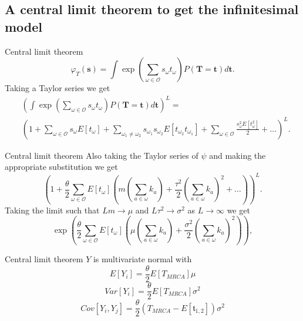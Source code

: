 \documentclass{beamer}
\begin{document}
\subsection{A central limit theorem to get the infinitesimal model}

\begin{frame}{Central limit theorem}
  \begin{equation*}
    \varphi_T(\mathbf{s}) = \int \exp \left( \sum_{\omega \in \mathcal{O}} s_{\omega}t_{\omega} \right)
    P(\mathbf{T}=\mathbf{t})d\mathbf{t}. \nonumber
  \end{equation*}
  Taking a Taylor series we get
  \scriptsize
  \begin{align}
    \label{eq:mgf_L}
    &\left(\int \exp \left( \sum_{\omega \in \mathcal{O}} s_{\omega}t_{\omega}
      \right)P(\mathbf{T}=\mathbf{t})d\mathbf{t}\right)^L = \nonumber \\  &\left(1 + \sum_{\omega \in \mathcal{O}}
      s_{\omega}E[t_{\omega}] + \sum_{\omega_1 \neq \omega_2}
      s_{\omega_1}s_{\omega_2}E[t_{\omega_2}t_{\omega_1}] + \sum_{\omega \in
        \mathcal{O}} \frac{s_{\omega}^2E[t_{\omega}^2]}{2} + \ldots\right)^L. \nonumber
  \end{align}
  \normalsize
\end{frame}

\begin{frame}{Central limit theorem}
  Also taking the Taylor series of $\psi$ and making the appropriate substitution we get
  \begin{equation*}
    \left( 1 + \frac{\theta}{2} \sum_{\omega \in \mathcal{O}} E[t_{\omega}]\left( m \left(
          \sum_{a \in \omega} k_a\right) + \frac{\tau^2}{2}\left( \sum_{a \in \omega}
          k_a\right)^2 + \ldots\right)\right)^L.
  \end{equation*}
  Taking the limit such that $Lm \to \mu$ and $L\tau^2\to \sigma^2$ as $L
  \to \infty$ we get
  \begin{equation*}
    \exp \left( \frac{\theta}{2} \sum_{\omega \in \mathcal{O}}E[t_{\omega}] \left( \mu \left(
          \sum_{a \in \omega} k_a\right) + \frac{\sigma^2}{2}\left( \sum_{a \in \omega}
          k_a\right)^2\right)\right),
  \end{equation*}
\end{frame}

\begin{frame}{Central limit theorem}
  $Y$ is multivariate normal with 
  \begin{equation*}
    E[Y_i] = \frac{\theta}{2} E[T_{MRCA}] \mu
  \end{equation*}
  \begin{equation*}
    Var[Y_i] = \frac{\theta}{2} E[T_{MRCA}] \sigma^2
  \end{equation*}
  \begin{equation*}
    Cov[Y_i, Y_j] = \frac{\theta}{2} (T_{MRCA}-E[\mathfrak{t}_{1,2}] )\sigma^2
  \end{equation*}
\end{frame}
\end{document}
